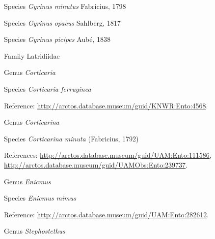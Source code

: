 \documentclass[9pt, article]{memoir}
\begin{document}
\begin{multicols}{2}
\vspace{6pt}\noindent\hspace{36pt}Species \textit{Gyrinus minutus} Fabricius, 1798


\vspace{6pt}\noindent\hspace{36pt}Species \textit{Gyrinus opacus} Sahlberg, 1817


\vspace{6pt}\noindent\hspace{36pt}Species \textit{Gyrinus picipes} Aubé, 1838


\vspace{6pt}\noindent\hspace{24pt}Family Latridiidae


\vspace{6pt}\noindent\hspace{30pt}Genus \textit{Corticaria}


\vspace{6pt}\noindent\hspace{36pt}Species \textit{Corticaria ferruginea}


\vspace{6pt}Reference: 
\url{http://arctos.database.museum/guid/KNWR:Ento:4568}.

\vspace{6pt}\noindent\hspace{30pt}Genus \textit{Corticarina}


\vspace{6pt}\noindent\hspace{36pt}Species \textit{Corticarina minuta} (Fabricius, 1792)


\vspace{6pt}References: 
\url{http://arctos.database.museum/guid/UAM:Ento:111586}, 
\url{http://arctos.database.museum/guid/UAMObs:Ento:239737}.

\vspace{6pt}\noindent\hspace{30pt}Genus \textit{Enicmus}


\vspace{6pt}\noindent\hspace{36pt}Species \textit{Enicmus mimus}


\vspace{6pt}Reference: 
\url{http://arctos.database.museum/guid/UAM:Ento:282612}.

\vspace{6pt}\noindent\hspace{30pt}Genus \textit{Stephostethus}



\end{multicols}
\end{document}
